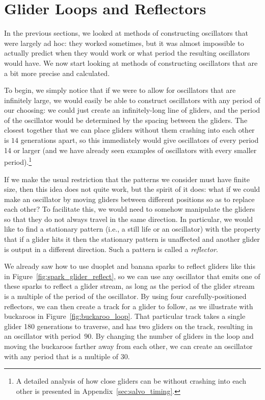 \section{Glider Loops and Reflectors}\label{sec:glider_loops}

In the previous sections, we looked at methods of constructing oscillators that were largely ad hoc: they worked sometimes, but it was almost impossible to actually predict when they would work or what period the resulting oscillators would have. We now start looking at methods of constructing oscillators that are a bit more precise and calculated.

To begin, we simply notice that if we were to allow for oscillators that are infinitely large, we would easily be able to construct oscillators with any period of our choosing: we could just create an infinitely-long line of gliders, and the period of the oscillator would be determined by the spacing between the gliders. The closest together that we can place gliders without them crashing into each other is $14$ generations apart, so this immediately would give oscillators of every period 14 or larger (and we have already seen examples of oscillators with every smaller period).\footnote{A detailed analysis of how close gliders can be without crashing into each other is presented in Appendix~\ref{sec:salvo_timing}.}

If we make the usual restriction that the patterns we consider must have finite size, then this idea does not quite work, but the spirit of it does: what if we could make an oscillator by moving gliders between different positions so as to replace each other? To facilitate this, we would need to somehow manipulate the gliders so that they do not always travel in the same direction. In particular, we would like to find a stationary pattern (i.e., a still life or an oscillator) with the property that if a glider hits it then the stationary pattern is unaffected and another glider is output in a different direction. Such a pattern is called a \emph{reflector}.

We already saw how to use duoplet and banana sparks to reflect gliders like this in Figure~\ref{fig:spark_glider_reflect}, so we can use any oscillator that emits one of these sparks to reflect a glider stream, as long as the period of the glider stream is a multiple of the period of the oscillator. By using four carefully-positioned reflectors, we can then create a track for a glider to follow, as we illustrate with buckaroos in Figure~\ref{fig:buckaroo_loop}. That particular track takes a single glider 180 generations to traverse, and has two gliders on the track, resulting in an oscillator with period~$90$. By changing the number of gliders in the loop and moving the buckaroos farther away from each other, we can create an oscillator with any period that is a multiple of $30$.

